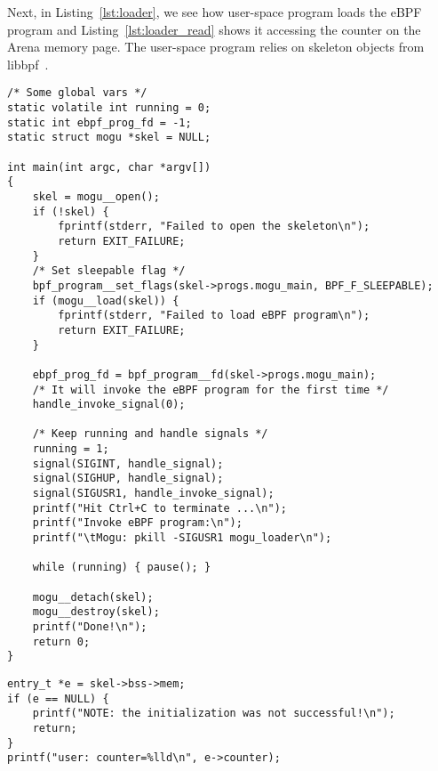 \documentclass{article}
\begin{document}
Next, in Listing~\ref{lst:loader}, we see how user-space program loads the eBPF
program and Listing~\ref{lst:loader_read} shows it accessing the counter on the
Arena memory page. The user-space program relies on skeleton objects from
libbpf~\cite{libbpf_skeleton}.

\begin{minipage}{\linewidth}
\begin{flushleft}
\begin{lstlisting}[caption={User space program loading the program}, label={lst:loader}]
/* Some global vars */
static volatile int running = 0;
static int ebpf_prog_fd = -1;
static struct mogu *skel = NULL;

int main(int argc, char *argv[])
{
    skel = mogu__open();
    if (!skel) {
        fprintf(stderr, "Failed to open the skeleton\n");
        return EXIT_FAILURE;
    }
    /* Set sleepable flag */
    bpf_program__set_flags(skel->progs.mogu_main, BPF_F_SLEEPABLE);
    if (mogu__load(skel)) {
        fprintf(stderr, "Failed to load eBPF program\n");
        return EXIT_FAILURE;
    }

    ebpf_prog_fd = bpf_program__fd(skel->progs.mogu_main);
    /* It will invoke the eBPF program for the first time */
    handle_invoke_signal(0);

    /* Keep running and handle signals */
    running = 1;
    signal(SIGINT, handle_signal);
    signal(SIGHUP, handle_signal);
    signal(SIGUSR1, handle_invoke_signal);
    printf("Hit Ctrl+C to terminate ...\n");
    printf("Invoke eBPF program:\n");
    printf("\tMogu: pkill -SIGUSR1 mogu_loader\n");

    while (running) { pause(); }

    mogu__detach(skel);
    mogu__destroy(skel);
    printf("Done!\n");
    return 0;
}
\end{lstlisting}
\end{flushleft}
\end{minipage}

\begin{minipage}{\linewidth}
\begin{flushleft}
\begin{lstlisting}[caption={User-space accessing the memory page allocated from
Arena}, label={lst:loader_read}]
entry_t *e = skel->bss->mem;
if (e == NULL) {
    printf("NOTE: the initialization was not successful!\n");
    return;
}
printf("user: counter=%lld\n", e->counter);
\end{lstlisting}
\end{flushleft}
\end{minipage}
\end{document}

